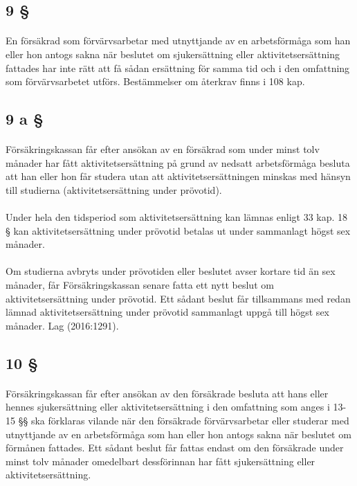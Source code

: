\documentclass[a4paper,notitlepage,openany,10pt]{book}
\begin{document}
\subsection*{9 §}
\paragraph*{}
En försäkrad som förvärvsarbetar med utnyttjande av en arbetsförmåga som han eller hon antogs sakna när beslutet om sjukersättning eller aktivitetsersättning fattades har inte rätt att få sådan ersättning för samma tid och i den omfattning som förvärvsarbetet utförs. Bestämmelser om återkrav finns i 108 kap.
\subsection*{9 a §}
\paragraph*{}
Försäkringskassan får efter ansökan av en försäkrad som under minst tolv månader har fått aktivitetsersättning på grund av nedsatt arbetsförmåga besluta att han eller hon får studera utan att aktivitetsersättningen minskas med hänsyn till studierna (aktivitetsersättning under prövotid).
\paragraph*{}
Under hela den tidsperiod som aktivitetsersättning kan lämnas enligt 33 kap. 18 § kan aktivitetsersättning under prövotid betalas ut under sammanlagt högst sex månader.
\paragraph*{}
Om studierna avbryts under prövotiden eller beslutet avser kortare tid än sex månader, får Försäkringskassan senare fatta ett nytt beslut om aktivitetsersättning under prövotid. Ett sådant beslut får tillsammans med redan lämnad aktivitetsersättning under prövotid sammanlagt uppgå till högst sex månader.
Lag (2016:1291).
\subsection*{10 §}
\paragraph*{}
Försäkringskassan får efter ansökan av den försäkrade besluta att hans eller hennes sjukersättning eller aktivitetsersättning i den omfattning som anges i 13-15 §§ ska förklaras vilande när den försäkrade förvärvsarbetar eller studerar med utnyttjande av en arbetsförmåga som han eller hon antogs sakna när beslutet om förmånen fattades. Ett sådant beslut får fattas endast om den försäkrade under minst tolv månader omedelbart dessförinnan har fått sjukersättning eller aktivitetsersättning.
\end{document}
